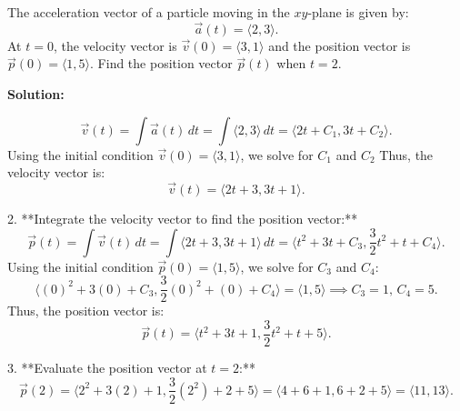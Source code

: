 \documentclass[12pt]{article}
\theoremstyle{beautifulthm}
\begin{document}
\begin{tcolorbox}[colback=examplebg, colframe=red!75!black, title=\textbf{EXAMPLE 3: acceleration vector}, fonttitle=\bfseries, sharp corners]

The acceleration vector of a particle moving in the $xy$-plane is given by:
\[
\vec{a}(t) = \langle 2, 3 \rangle.
\]
At $t = 0$, the velocity vector is $\vec{v}(0) = \langle 3, 1 \rangle$ and the position vector is $\vec{p}(0) = \langle 1, 5 \rangle$. Find the position vector $\vec{p}(t)$ when $t = 2$.

\tcblower
\textbf{Solution:} 

   \[
   \vec{v}(t) = \int \vec{a}(t) \, dt = \int \langle 2, 3 \rangle \, dt = \langle 2t + C_1, 3t + C_2 \rangle.
   \]
   Using the initial condition $\vec{v}(0) = \langle 3, 1 \rangle$, we solve for $C_1$ and $C_2$
   Thus, the velocity vector is:
   \[
   \vec{v}(t) = \langle 2t + 3, 3t + 1 \rangle.
   \]

2. **Integrate the velocity vector to find the position vector:**
   \[
   \vec{p}(t) = \int \vec{v}(t) \, dt = \int \langle 2t + 3, 3t + 1 \rangle \, dt = \langle t^2 + 3t + C_3, \frac{3}{2}t^2 + t + C_4 \rangle.
   \]
   Using the initial condition $\vec{p}(0) = \langle 1, 5 \rangle$, we solve for $C_3$ and $C_4$:
   \[
   \langle (0)^2 + 3(0) + C_3, \frac{3}{2}(0)^2 + (0) + C_4 \rangle = \langle 1, 5 \rangle \implies C_3 = 1, \, C_4 = 5.
   \]
   Thus, the position vector is:
   \[
   \vec{p}(t) = \langle t^2 + 3t + 1, \frac{3}{2}t^2 + t + 5 \rangle.
   \]

3. **Evaluate the position vector at $t = 2$:**
   \[
   \vec{p}(2) = \langle 2^2 + 3(2) + 1, \frac{3}{2}(2^2) + 2 + 5 \rangle = \langle 4 + 6 + 1, 6 + 2 + 5 \rangle = \langle 11, 13 \rangle.
   \]
\end{tcolorbox}
\end{document}
